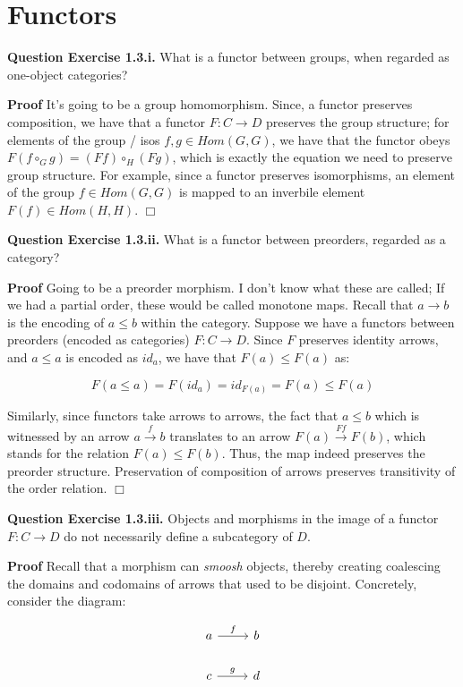 \documentclass[11pt]{report}
\def\qed{$\Box$}
\newcommand*{\question}[1]{\leavevmode\newline \textbf{Question #1.}}
\newcommand*{\proof}[1]{\leavevmode\newline \textbf{Proof #1}}
\begin{document}
\section{Functors}

\question{Exercise 1.3.i}  What is a functor between groups, when regarded as one-object categories?


\proof{} It's going to be a group homomorphism. Since, a functor preserves composition, we have that a
functor $F: C \rightarrow D$ preserves the group structure; for elements of the group / isos $f, g \in Hom(G, G)$, 
we have that the functor obeys $F(f \circ_G g) = (F f) \circ_H (F g)$, which is exactly the equation
we need to preserve group structure. For example, since a functor preserves isomorphisms, an element of the group $f \in Hom(G, G)$
is mapped to an inverbile element $F(f) \in Hom(H, H)$. \qed


\question{Exercise 1.3.ii}  What is a functor between preorders, regarded as a category?

\proof{}Going to be a preorder morphism. I don't know what these are called; If we had a partial order, these
would be called monotone maps. Recall that $a \rightarrow b$ is the encoding of $a \leq b$  within the category.
Suppose we have a functors between preorders (encoded as categories) $F: C \rightarrow D$. Since $F$ preserves
identity arrows, and $a \leq a$ is encoded as $id_a$, we have that $F(a) \leq F(a)$ as:

$$F(a \leq a) = F(id_a) = id_{F(a)} = F(a) \leq F(a)$$


Similarly, since functors take arrows to arrows, the fact that $a \leq b$ which is witnessed by an arrow $a \xrightarrow{f} b$
translates to an arrow $F(a) \xrightarrow{F f} F(b)$, which stands for the relation $F(a) \leq F(b)$. Thus, the map indeed
preserves the preorder structure. Preservation of composition of arrows preserves transitivity of the order relation. \qed


\question{Exercise 1.3.iii} Objects and morphisms in the image of a functor $F: C \rightarrow D$ do not necessarily define a subcategory of $D$.

\proof{} Recall that a morphism can \emph{smoosh} objects, thereby creating coalescing the domains and codomains
of arrows that used to be disjoint. Concretely, consider the diagram:

\[\begin{tikzcd}
	a & b \\
	c & d
	\arrow["g", from=2-1, to=2-2]
	\arrow["f", from=1-1, to=1-2]
\end{tikzcd}\]
\end{document}
